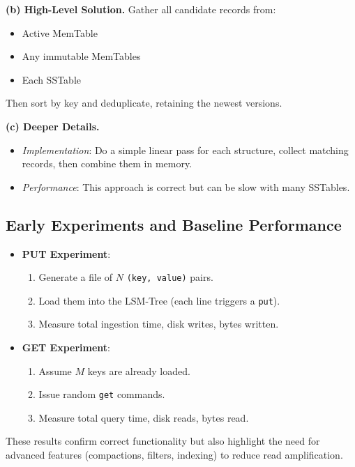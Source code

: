 \documentclass[10pt]{article}
\begin{document}
\textbf{(b) High-Level Solution.}  
Gather all candidate records from:
\begin{itemize}
  \item Active MemTable
  \item Any immutable MemTables
  \item Each SSTable
\end{itemize}
Then sort by key and deduplicate, retaining the newest versions.

\textbf{(c) Deeper Details.}  
\begin{itemize}
  \item \emph{Implementation}: Do a simple linear pass for each structure, collect matching records, then combine them in memory.
  \item \emph{Performance}: This approach is correct but can be slow with many SSTables.
\end{itemize}

\subsection{Early Experiments and Baseline Performance}
\begin{itemize}
  \item \textbf{PUT Experiment}: 
    \begin{enumerate}
      \item Generate a file of $N$ \texttt{(key, value)} pairs.
      \item Load them into the LSM-Tree (each line triggers a \texttt{put}).
      \item Measure total ingestion time, disk writes, bytes written.
    \end{enumerate}
  \item \textbf{GET Experiment}:
    \begin{enumerate}
      \item Assume $M$ keys are already loaded.
      \item Issue random \texttt{get} commands.
      \item Measure total query time, disk reads, bytes read.
    \end{enumerate}
\end{itemize}
These results confirm correct functionality but also highlight the need for advanced features (compactions, filters, indexing) to reduce read amplification.
\end{document}
